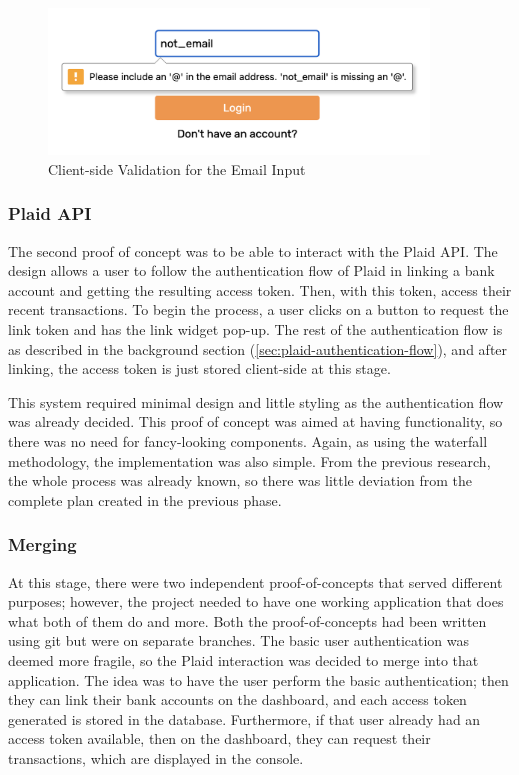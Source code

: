 \begin{figure}[H]
	\centering
	\includegraphics[width=0.9\textwidth]{images/email_validation.png}
	\caption{Client-side Validation for the Email Input}
	\label{fig:Email_validation}
\end{figure}

\subsubsection{Plaid API}
The second proof of concept was to be able to interact with the Plaid API. The design allows a user to follow the authentication flow of Plaid in linking a bank account and getting the resulting access token. Then, with this token, access their recent transactions. To begin the process, a user clicks on a button to request the link token and has the link widget pop-up. The rest of the authentication flow is as described in the background section (\ref{sec:plaid-authentication-flow}), and after linking, the access token is just stored client-side at this stage.

This system required minimal design and little styling as the authentication flow was already decided. This proof of concept was aimed at having functionality, so there was no need for fancy-looking components. Again, as using the waterfall methodology, the implementation was also simple. From the previous research, the whole process was already known, so there was little deviation from the complete plan created in the previous phase.

\subsubsection{Merging}
At this stage, there were two independent proof-of-concepts that served different purposes; however, the project needed to have one working application that does what both of them do and more. Both the proof-of-concepts had been written using git but were on separate branches. The basic user authentication was deemed more fragile, so the Plaid interaction was decided to merge into that application. The idea was to have the user perform the basic authentication; then they can link their bank accounts on the dashboard, and each access token generated is stored in the database. Furthermore, if that user already had an access token available, then on the dashboard, they can request their transactions, which are displayed in the console.

